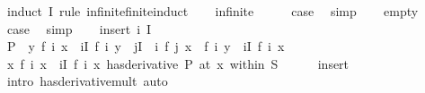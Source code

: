\begin{isabellebody}
%
\isadelimproof
%
\endisadelimproof
%
\isatagproof
{}\isamarkupfalse%
\ {\isacharparenleft}{\kern0pt}induct\ I\ rule{\isacharcolon}{\kern0pt}\ infinite{\isacharunderscore}{\kern0pt}finite{\isacharunderscore}{\kern0pt}induct{\isacharparenright}{\kern0pt}\isanewline
\ \ \isamarkupfalse%
\ infinite\isanewline
\ \ \isamarkupfalse%
\ \isamarkupfalse%
\ {\isacharquery}{\kern0pt}case\ \isamarkupfalse%
\ simp\isanewline
{}\isamarkupfalse%
\isanewline
\ \ \isamarkupfalse%
\ empty\isanewline
\ \ \isamarkupfalse%
\ \isamarkupfalse%
\ {\isacharquery}{\kern0pt}case\ \isamarkupfalse%
\ simp\isanewline
{}\isamarkupfalse%
\isanewline
\ \ \isamarkupfalse%
\ {\isacharparenleft}{\kern0pt}insert\ i\ I{\isacharparenright}{\kern0pt}\isanewline
\ \ \isamarkupfalse%
\ {\isacharquery}{\kern0pt}P\ {\isacharequal}{\kern0pt}\ {\isachardoublequoteopen}{\isasymlambda}y{\isachardot}{\kern0pt}\ f\ i\ x\ {\isacharasterisk}{\kern0pt}\ {\isacharparenleft}{\kern0pt}{\isasymSum}i{\isasymin}I{\isachardot}{\kern0pt}\ f{\isacharprime}{\kern0pt}\ i\ y\ {\isacharasterisk}{\kern0pt}\ {\isacharparenleft}{\kern0pt}{\isasymProd}j{\isasymin}I\ {\isacharminus}{\kern0pt}\ {\isacharbraceleft}{\kern0pt}i{\isacharbraceright}{\kern0pt}{\isachardot}{\kern0pt}\ f\ j\ x{\isacharparenright}{\kern0pt}{\isacharparenright}{\kern0pt}\ {\isacharplus}{\kern0pt}\ {\isacharparenleft}{\kern0pt}f{\isacharprime}{\kern0pt}\ i\ y{\isacharparenright}{\kern0pt}\ {\isacharasterisk}{\kern0pt}\ {\isacharparenleft}{\kern0pt}{\isasymProd}i{\isasymin}I{\isachardot}{\kern0pt}\ f\ i\ x{\isacharparenright}{\kern0pt}{\isachardoublequoteclose}\isanewline
\ \ \isamarkupfalse%
\ {\isachardoublequoteopen}{\isacharparenleft}{\kern0pt}{\isacharparenleft}{\kern0pt}{\isasymlambda}x{\isachardot}{\kern0pt}\ f\ i\ x\ {\isacharasterisk}{\kern0pt}\ {\isacharparenleft}{\kern0pt}{\isasymProd}i{\isasymin}I{\isachardot}{\kern0pt}\ f\ i\ x{\isacharparenright}{\kern0pt}{\isacharparenright}{\kern0pt}\ has{\isacharunderscore}{\kern0pt}derivative\ {\isacharquery}{\kern0pt}P{\isacharparenright}{\kern0pt}\ {\isacharparenleft}{\kern0pt}at\ x\ within\ S{\isacharparenright}{\kern0pt}{\isachardoublequoteclose}\isanewline
\ \ \ \ \isamarkupfalse%
\ insert\ \isamarkupfalse%
\ {\isacharparenleft}{\kern0pt}intro\ has{\isacharunderscore}{\kern0pt}derivative{\isacharunderscore}{\kern0pt}mult{\isacharparenright}{\kern0pt}\ auto\isanewline

\end{isabellebody}
